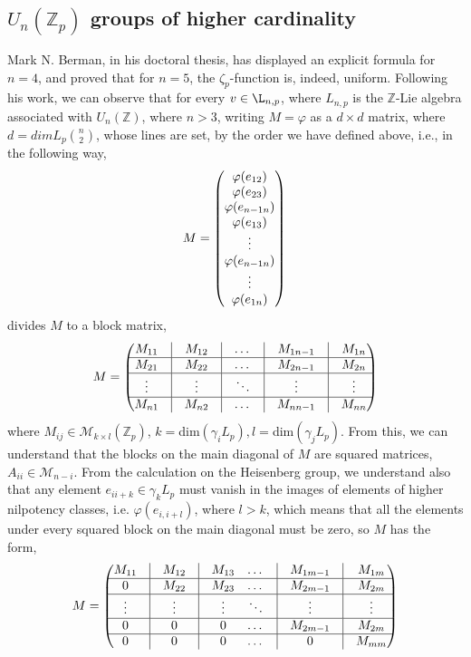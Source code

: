 \documentclass[12pt]{article}
\begin{document}
\subsection{$U_n(\mathbb{Z}_p)$ groups of higher cardinality}
Mark N. Berman, in his doctoral thesis\cite{Berman}, has displayed an explicit formula for $n=4$, and proved that for $n=5$, the $\zeta_p$-function is, indeed, uniform.
Following his work, we can observe that for every $v\in\L_{n,p}$, where $L_{n,p}$ is the $\mathbb{Z}$-Lie algebra associated with $U_n(\mathbb{Z})$, where $n>3$, writing $M=\varphi$ as a $d\times d$ matrix, where $d=dimL_p\binom{n}{2}$, whose lines are set, by the order we have defined above, i.e., in the following way,
$$
M=\begin{pmatrix}
\varphi(e_{12})\\
\varphi(e_{23})\\
\varphi(e_{n-1n})\\
\varphi(e_{13})\\
\vdots\\
\varphi(e_{n-1n})\\
\vdots\\
\varphi(e_{1n})\\
\end{pmatrix}\\
$$
divides $M$ to a block matrix, $$M=\begin{pmatrix}
M_{11} & \vline & M_{12}&\vline & \dots& \vline & M_{1n-1} & \vline&M_{1n}\\
\hline
M_{21} & \vline & M_{22}&\vline & \dots &\vline & M_{2n-1} &\vline& M_{2n}\\
\hline
\vdots & \vline & \vdots&\vline & \ddots &\vline & \vdots &\vline& \vdots\\
\hline
M_{n1} & \vline & M_{n2}&\vline & \dots &\vline & M_{nn-1} &\vline& M_{nn}\\
\end{pmatrix}
$$
where $M_{ij}\in\mathcal{M}_{k\times l}(\mathbb{Z}_p)$, $k=$dim$(\gamma_iL_p),l=$dim$(\gamma_jL_p)$. From this, we can understand that the blocks on the main diagonal of $M$ are squared matrices, $A_{ii}\in\mathcal{M}_{n-i}$. From the calculation on the Heisenberg group, we understand also that any element $e_{ii+k}\in\gamma_kL_p$ must vanish in the images of elements of higher nilpotency classes, i.e. $\varphi(e_{i,i+l})$, where $l>k$, which means that all the elements under every squared block on the main diagonal must be zero, so $M$ has the form, $$M=\begin{pmatrix}
M_{11} & \vline & M_{12}&\vline & M_{13} & \dots& \vline & M_{1m-1} & \vline&M_{1m}\\
\hline
0 & \vline & M_{22}&\vline & M_{23} & \dots &\vline & M_{2m-1} &\vline& M_{2m}\\
\hline
\vdots & \vline & \vdots&\vline & \vdots & \ddots &\vline & \vdots &\vline& \vdots\\
\hline
0 & \vline & 0&\vline & 0 & \dots &\vline & M_{2m-1} &\vline& M_{2m}\\
\hline
0 & \vline & 0 &\vline & 0 & \dots &\vline & 0 &\vline& M_{mm}\\
\end{pmatrix}
$$
\end{document}
